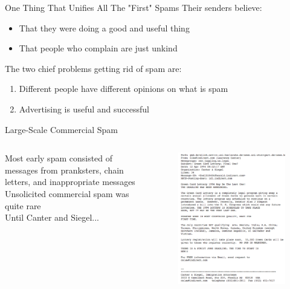 \documentclass[nobackground,dvipsnames,table]{beamer}
\begin{document}
\begin{frame}{One Thing That Unifies All The "First" Spams}
    Their senders believe:\\
    \begin{itemize}
        \item That they were doing a good and useful thing
        \item That people who complain are just unkind
    \end{itemize}
    The two chief problems getting rid of spam are:\\
    \begin{enumerate}
        \item Different people have different opinions on what is spam
        \item Advertising is useful and successful 
    \end{enumerate}
\end{frame}

\begin{frame}{Large-Scale Commercial Spam}
    \begin{columns}
            Most early spam consisted of messages from pranksters, chain letters, and inappropriate messages\\
            Unsolicited commercial spam was quite rare\\
            Until Canter and Siegel...
            \begin{figure}
                \centering
                \includegraphics[width=\textwidth]{canter-and-siegel}
            \end{figure}
    \end{columns}
\end{frame}
\end{document}
